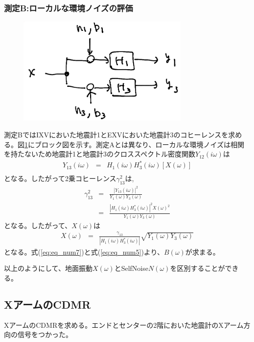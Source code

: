 \subsubsection{測定B:ローカルな環境ノイズの評価}
\begin{figure}[H]
  \begin{center}
    \includegraphics[width=8.5cm]{./testB.png}
  \end{center}
  \caption{
  }\label{img:img_testB}
\end{figure}

測定BではIXVにおいた地震計1とEXVにおいた地震計3のコヒーレンスを求める。図\ref{img:img_testB}にブロック図を示す。測定Aとは異なり、ローカルな環境ノイズは相関を持たないため地震計1と地震計3のクロススペクトル密度関数$Y_{12}(i\omega)$は
\begin{eqnarray}
Y_{13}(i\omega) &=& H_{1}(i\omega)H_{3}^{*}(i\omega)\left[X(\omega) \right] \\ 
\end{eqnarray}
となる。したがって2乗コヒーレンス$\gamma_{13}^{2}$は,
\begin{eqnarray}
  \gamma_{13}^{2} &=& \frac{\left| Y_{13}(i\omega)\right|^{2}}{Y_1(\omega)Y_3({\omega})}\\
  &=& \frac{\left | H_{1}(i\omega)H_{3}^{*}(i\omega)\right|^{2}X(\omega)^{2}}{Y_1(\omega)Y_3({\omega})}\label{eq:eq_nm6}
\end{eqnarray}
となる。したがって、$X(\omega)$は
\begin{eqnarray}
  X(\omega) &=& \frac{\gamma_{13}}{\left | H_{1}(i\omega)H_{3}^{*}(i\omega)\right|}
  \sqrt{Y_1(\omega)Y_3({\omega})} \label{eq:eq_nm7}
\end{eqnarray}
となる。式(\ref{eq:eq_num7})と式(\ref{eq:eq_num5})より、$B(\omega)$が求まる。


以上のようにして、地面振動$X(\omega)$とSelfNoise$N(\omega)$を区別することができる。


\subsection{XアームのCDMR}
XアームのCDMRを求める。エンドとセンターの2階においた地震計のXアーム方向の信号をつかった。

